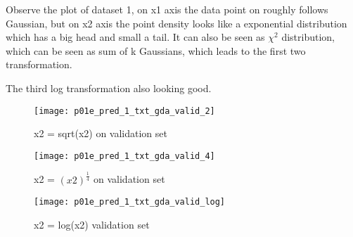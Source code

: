 \begin{answer}

Observe the plot of dataset 1, on x1 axis the data point
on roughly follows Gaussian, but on x2 axis the point density 
looks like a exponential distribution which has a big head
and small a tail. It can also be seen as $\chi^2$ distribution,
which can be seen as sum of k Gaussians,  which leads to the 
first two transformation. 

The third log transformation also looking good.

    \begin{figure}[h]
        \centering
        \texttt{[image: p01e\_pred\_1\_txt\_gda\_valid\_2]}
        \caption{ x2 = sqrt(x2) on validation set}
    \end{figure}
    
    \begin{figure}[h]
        \centering
        \texttt{[image: p01e\_pred\_1\_txt\_gda\_valid\_4]}
        \caption{ x2 = $(x2)^{\frac{1}{4}}$ on validation set }
    \end{figure}
    
    \begin{figure}[h]
        \centering
        \texttt{[image: p01e\_pred\_1\_txt\_gda\_valid\_log]}
        \caption{ x2 = log(x2) validation set }
    \end{figure}

\end{answer}
